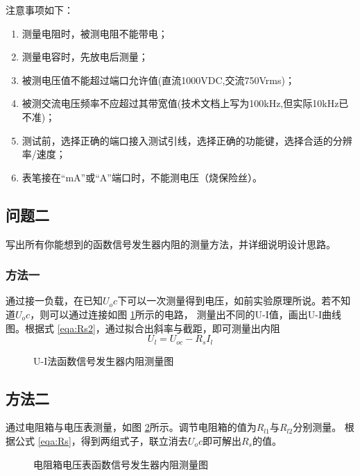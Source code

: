 \documentclass[a4paper,11pt,UTF8]{ctexart}
\begin{document}
注意事项如下：
\begin{enumerate}
  \item 测量电阻时，被测电阻不能带电；
  \item 测量电容时，先放电后测量；
  \item 被测电压值不能超过端口允许值(直流1000VDC,交流750Vrms)；
  \item 被测交流电压频率不应超过其带宽值(技术文档上写为100kHz,但实际10kHz已不准)；
  \item 测试前，选择正确的端口接入测试引线，选择正确的功能键，选择合适的分辨率/速度；
  \item 表笔接在“mA”或“A”端口时，不能测电压（烧保险丝）。
\end{enumerate}
\subsection{问题二}
写出所有你能想到的函数信号发生器内阻的测量方法，并详细说明设计思路。
\subsubsection{方法一}
通过接一负载，在已知$U_oc$下可以一次测量得到电压，如前实验原理所说。若不知道$U_oc$，则可以通过连接如图 \ref{fig:FunR2}所示的电路，
测量出不同的U-I值，画出U-I曲线图。根据式 \ref{eqa:Rs2}，通过拟合出斜率与截距，即可测量出内阻
\begin{equation}
U_l=U_{oc}-R_sI_l
\label{eqa:Rs2}
\end{equation}
  
\begin{figure}[htbp]
\centering
{}
\caption{U-I法函数信号发生器内阻测量图}
\label{fig:FunR2}
\end{figure}

\subsection{方法二}
通过电阻箱与电压表测量，如图 \ref{fig:FunR3}所示。调节电阻箱的值为$R_{l1}$与$R_{l2}$分别测量。
根据公式 \ref{eqa:Rs}，得到两组式子，联立消去$U_oc$即可解出$R_s$的值。
\begin{figure}[htbp]
  \centering
  \caption{电阻箱电压表函数信号发生器内阻测量图}
  \label{fig:FunR3}
  \end{figure}
  
\end{document}
